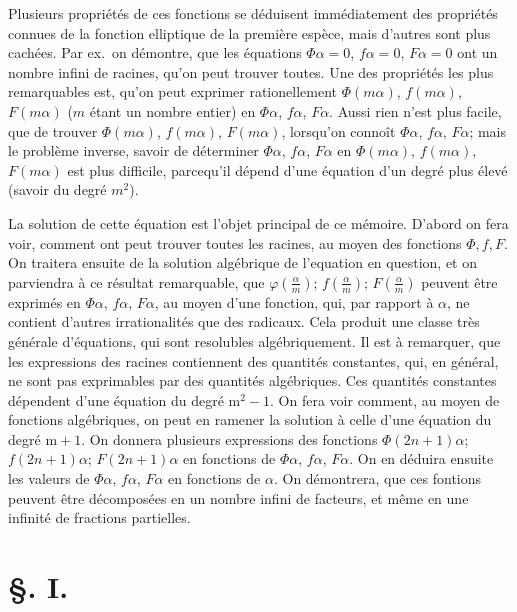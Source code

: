 \documentclass{article}
\begin{document}
Plusieurs propriétés de ces fonctions se déduisent immédiatement des propriétés connues de la fonction elliptique de la première espèce, mais d'autres sont plus cachées. Par ex.\ on démontre, que les équations $\Phi\alpha=0$, $f\alpha=0$, $F\alpha=0$ ont un nombre infini de racines, qu'on peut trouver toutes. Une des propriétés les plus remarquables est, qu'on peut exprimer rationellement $\Phi(m\alpha)$, $f(m\alpha)$, $F(m\alpha)$ ($m$ étant un nombre entier) en $\Phi\alpha$, $f\alpha$, $F\alpha$. Aussi rien n'est plus facile, que de trouver $\Phi(m\alpha)$, $f(m\alpha)$, $F(m\alpha)$, lorsqu'on connoît $\Phi\alpha$, $f\alpha$, $F\alpha$; mais le problème inverse, savoir de déterminer $\Phi\alpha$, $f\alpha$, $F\alpha$ en $\Phi(m\alpha)$, $f(m\alpha)$, $F(m\alpha)$ est plus difficile, parcequ'il dépend d'une équation d'un degré plus élevé (savoir du degré $m^{2}$).

La solution de cette équation est l'objet principal de ce mémoire. D'abord on fera voir, comment ont peut trouver toutes les racines, au moyen des fonctions $\Phi,f,F$. On traitera ensuite de la solution algébrique de l'equation en question, et on parviendra à ce résultat remarquable, que $\varphi\left(\frac{\alpha}{m}\right)$; $f\left(\frac{\alpha}{m}\right)$; $F\left(\frac{\alpha}{m}\right)$ peuvent être exprimés en $\Phi\alpha$, $f\alpha$, $F\alpha$, au moyen d'une fonction, qui, par rapport à $\alpha$, ne contient d'autres irrationalités que des radicaux. Cela produit une classe très générale d'équations, qui sont resolubles algébriquement. Il est à remarquer, que les expressions des racines contiennent des quantités constantes, qui, en général, ne sont pas exprimables par des quantités algébriques. Ces quantités constantes dépendent d'une équation du degré $\mathrm{m}^{2}-1$. On fera voir comment, au moyen de fonctions algébriques, on peut en ramener la solution à celle d'une équation du degré $\mathrm{m}+1$. On donnera plusieurs expressions des fonctions $\Phi(2n+1)\alpha$; $f(2n+1)\alpha$; $F(2n+1)\alpha$ en fonctions de $\Phi\alpha$, $f\alpha$, $F\alpha$. On en déduira ensuite les valeurs de $\Phi\alpha$, $f\alpha$, $F\alpha$ en fonctions de $\alpha$. On démontrera, que ces fontions peuvent être décomposées en un nombre infini de facteurs, et même en une infinité de fractions partielles.

\section*{§. I.}
\end{document}
